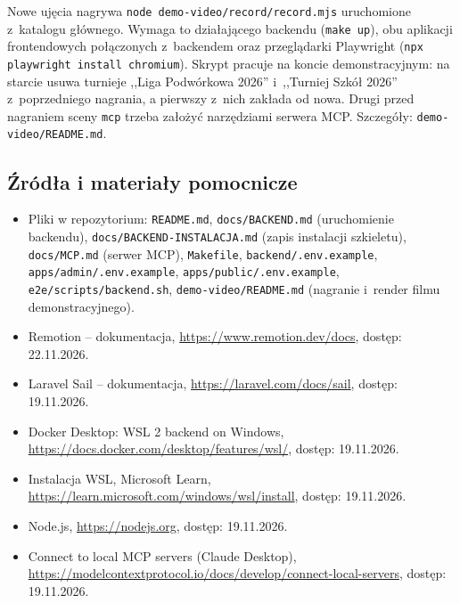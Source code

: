 \documentclass[11pt,a4paper,oneside]{article}
\newif\ifpodpowiedzi
\newcommand{\podpowiedz}[1]{\ifpodpowiedzi\par\begingroup\small\color{hintcolor}\textit{Wskazówka: #1}\par\endgroup\fi}
\begin{document}
Nowe ujęcia nagrywa \texttt{node demo-video/record/record.mjs} uruchomione z~katalogu głównego. Wymaga to działającego backendu (\texttt{make up}), obu aplikacji frontendowych połączonych z~backendem oraz przeglądarki Playwright (\texttt{npx playwright install chromium}). Skrypt pracuje na koncie demonstracyjnym: na starcie usuwa turnieje ,,Liga Podwórkowa 2026'' i~,,Turniej Szkół 2026'' z~poprzedniego nagrania, a pierwszy z~nich zakłada od nowa. Drugi przed nagraniem sceny \texttt{mcp} trzeba założyć narzędziami serwera MCP. Szczegóły: \texttt{demo-video/README.md}.

\subsection{Źródła i materiały pomocnicze}
\podpowiedz{Wskaż wykorzystane instrukcje producentów, dokumentację narzędzi oraz przekazane pliki pomocnicze, np. przykładową konfigurację i skrypty instalacyjne. Podaj nazwy i lokalizacje plików; dla źródeł internetowych - tytuł, adres i datę dostępu. Usuń podsekcję, jeśli nie ma takich materiałów.}
\begin{itemize}
\item Pliki w repozytorium: \texttt{README.md}, \texttt{docs/BACKEND.md} (uruchomienie backendu), \texttt{docs/BACKEND-INSTALACJA.md} (zapis instalacji szkieletu), \texttt{docs/MCP.md} (serwer MCP), \texttt{Makefile}, \texttt{backend/.env.example}, \texttt{apps/admin/.env.example}, \texttt{apps/public/.env.example}, \texttt{e2e/scripts/backend.sh}, \texttt{demo-video/README.md} (nagranie i~render filmu demonstracyjnego).
\item Remotion -- dokumentacja, \url{https://www.remotion.dev/docs}, dostęp: 22.11.2026.
\item Laravel Sail -- dokumentacja, \url{https://laravel.com/docs/sail}, dostęp: 19.11.2026.
\item Docker Desktop: WSL 2 backend on Windows, \url{https://docs.docker.com/desktop/features/wsl/}, dostęp: 19.11.2026.
\item Instalacja WSL, Microsoft Learn, \url{https://learn.microsoft.com/windows/wsl/install}, dostęp: 19.11.2026.
\item Node.js, \url{https://nodejs.org}, dostęp: 19.11.2026.
\item Connect to local MCP servers (Claude Desktop), \url{https://modelcontextprotocol.io/docs/develop/connect-local-servers}, dostęp: 19.11.2026.
\end{itemize}
\end{document}
